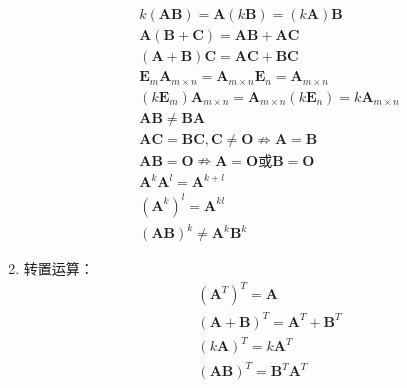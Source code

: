 \documentclass[12pt]{book}
\begin{document}
\begin{enumerate}[1.]
\begin{align*}
               & k(\bm{AB}) = \bm{A}(k\bm{B}) = (k\bm{A})\bm{B}                                                                                 \\
               & \bm{A}(\bm{B}+\bm{C}) = \bm{AB}+\bm{AC}                                                                                        \\
               & (\bm{A}+\bm{B})\bm{C} = \bm{AC}+\bm{BC}                                                                                        \\
               & \bm{E}_{m} \bm{A}_{m\times n} = \bm{A}_{m\times n}\bm{E}_{n}    =  \bm{A}_{m\times n}                                          \\
               & (k\bm{E}_{m})\bm{A}_{m\times n} = \bm{A}_{m\times n}(k\bm{E}_{n}) = k\bm{A}_{m\times n}                                        \\
               & \bm{AB}\neq \bm{BA}                                                                                                            \\
               & \bm{AC}=\bm{BC}, \bm{C}\neq\bm{O}\nRightarrow \bm{A}=\bm{B}                                                                    \\
               & \bm{AB}=\bm{O} \nRightarrow \bm{A}=\bm{O}\text{或}\bm{B}=\bm{O}                                                                \\
               & \bm{A}^k\bm{A}^{l} = \bm{A}^{k+l}                                                                                              \\
               & (\bm{A}^k)^l = \bm{A}^{kl}                                                                                                     \\
               & (\bm{AB})^{k}\neq \bm{A}^{k}\bm{B}^{k}
          \end{align*}
    \item 转置运算：
          \begin{align*}
               & (\mathbf{A}^{T})^T = \mathbf{A}                         \\
               & (\mathbf{A}+\mathbf{B})^T = \mathbf{A}^T + \mathbf{B}^T \\
               & (k\mathbf{A})^T = k \mathbf{A}^T                        \\
               & (\mathbf{A}\mathbf{B})^T = \mathbf{B}^T \mathbf{A}^T
          \end{align*}

\end{enumerate}
\end{document}
